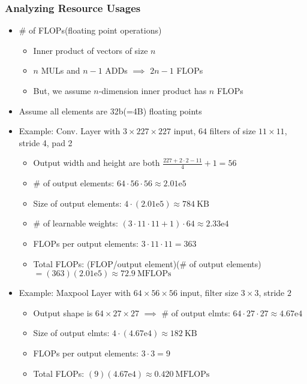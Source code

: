 \subsubsection*{Analyzing Resource Usages}
\begin{itemize}
    \item \# of FLOPs(floating point operations)
    \begin{itemize}
        \item Inner product of vectors of size $n$
        \item $n$ MULs and $n-1$ ADDs $\implies$ $2n-1$ FLOPs
        \item But, we assume $n$-dimension inner product has $n$ FLOPs
    \end{itemize}
    \item Assume all elements are 32b(=4B) floating points
    \item Example: Conv. Layer with $3\times227\times227$ input, $64$ filters of size $11\times11$, stride 4, pad 2
    \begin{itemize}
        \item Output width and height are both $\frac{227+2\cdot2-11}{4}+1=56$
        \item \# of output elements: $64\cdot56\cdot56\approx2.01\text{e}5$
        \item Size of output elements: $4\cdot(2.01\text{e}5)\approx784~\text{KB}$
        \item \# of learnable weights: $(3\cdot11\cdot11+1)\cdot64\approx2.33\text{e}4$
        \item FLOPs per output elements: $3\cdot11\cdot11=363$
        \item Total FLOPs: (FLOP/output element)(\# of output elements)$=(363)(2.01\text{e}5)\approx72.9~\text{MFLOPs}$
    \end{itemize}
    \item Example: Maxpool Layer with $64\times56\times56$ input, filter size $3\times3$, stride $2$
    \begin{itemize}
        \item Output shape is $64\times27\times27$ $\implies$ \# of output elmts: $64\cdot27\cdot27\approx4.67\text{e}4$
        \item Size of output elmts: $4\cdot(4.67\text{e}4)\approx182~\text{KB}$
        \item FLOPs per output elements: $3\cdot3=9$
        \item Total FLOPs: $(9)(4.67\text{e}4)\approx0.420~\text{MFLOPs}$
    \end{itemize}
\end{itemize}

